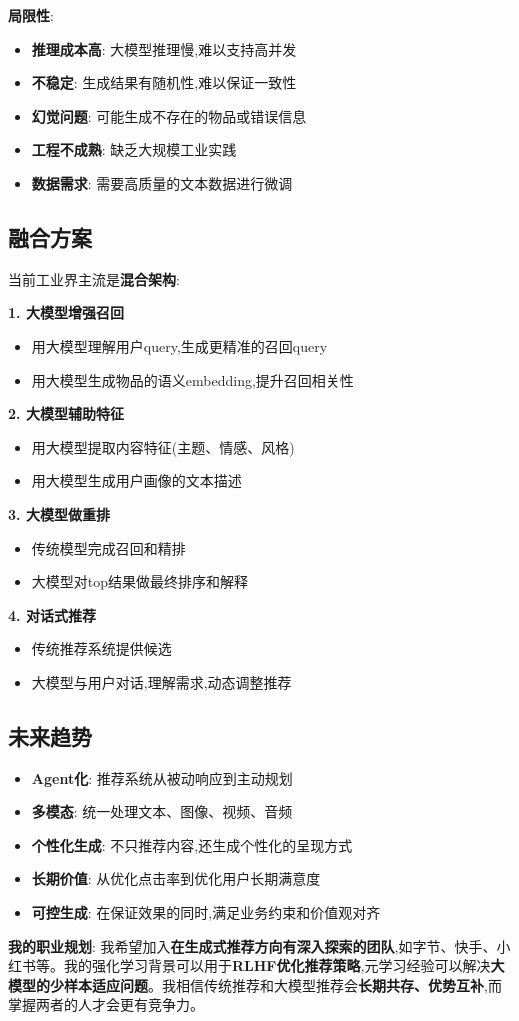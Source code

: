 \documentclass[UTF8]{ctexart}
\begin{document}
\textbf{局限性}:
\begin{itemize}
    \item \textbf{推理成本高}: 大模型推理慢,难以支持高并发
    \item \textbf{不稳定}: 生成结果有随机性,难以保证一致性
    \item \textbf{幻觉问题}: 可能生成不存在的物品或错误信息
    \item \textbf{工程不成熟}: 缺乏大规模工业实践
    \item \textbf{数据需求}: 需要高质量的文本数据进行微调
\end{itemize}

\subsection{融合方案}

当前工业界主流是\textbf{混合架构}:

\textbf{1. 大模型增强召回}
\begin{itemize}
    \item 用大模型理解用户query,生成更精准的召回query
    \item 用大模型生成物品的语义embedding,提升召回相关性
\end{itemize}

\textbf{2. 大模型辅助特征}
\begin{itemize}
    \item 用大模型提取内容特征(主题、情感、风格)
    \item 用大模型生成用户画像的文本描述
\end{itemize}

\textbf{3. 大模型做重排}
\begin{itemize}
    \item 传统模型完成召回和精排
    \item 大模型对top结果做最终排序和解释
\end{itemize}

\textbf{4. 对话式推荐}
\begin{itemize}
    \item 传统推荐系统提供候选
    \item 大模型与用户对话,理解需求,动态调整推荐
\end{itemize}

\subsection{未来趋势}

\begin{itemize}
    \item \textbf{Agent化}: 推荐系统从被动响应到主动规划
    \item \textbf{多模态}: 统一处理文本、图像、视频、音频
    \item \textbf{个性化生成}: 不只推荐内容,还生成个性化的呈现方式
    \item \textbf{长期价值}: 从优化点击率到优化用户长期满意度
    \item \textbf{可控生成}: 在保证效果的同时,满足业务约束和价值观对齐
\end{itemize}

\textbf{我的职业规划}: 我希望加入\textbf{在生成式推荐方向有深入探索的团队},如字节、快手、小红书等。我的强化学习背景可以用于\textbf{RLHF优化推荐策略},元学习经验可以解决\textbf{大模型的少样本适应问题}。我相信传统推荐和大模型推荐会\textbf{长期共存、优势互补},而掌握两者的人才会更有竞争力。
\end{document}
